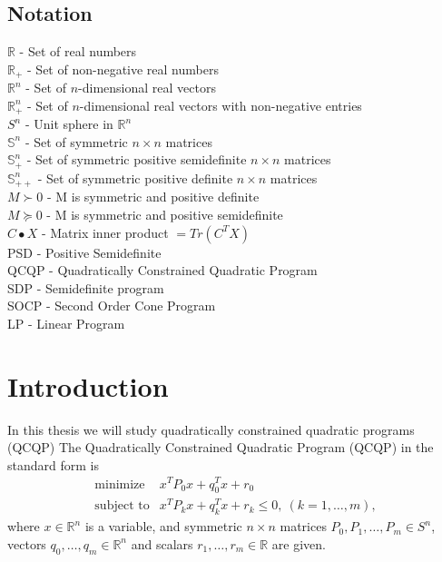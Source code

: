 \documentclass[12pt]{book}
\author{Matúš Stehlík}
\theoremstyle{definition}
\begin{document}
\section*{Notation}

$\mathbb{R}$ - Set of real numbers \\
$\mathbb{R}_+$ - Set of non-negative real numbers \\
$\mathbb{R}^n$ - Set of $n$-dimensional real vectors   \\
$\mathbb{R}^n_{+}$ -  Set of $n$-dimensional real vectors with non-negative entries  \\

$S^n$ - Unit sphere in $\mathbb{R}^n$ \\


$\mathbb{S}^n$ - Set of symmetric $n\times n$ matrices \\
$\mathbb{S}^n_+$ - Set of symmetric positive semidefinite $n\times n$ matrices \\
$\mathbb{S}^n_{++}$ - Set of symmetric positive definite $n\times n$ matrices \\

$M\succ 0$ - M is symmetric and positive definite \\
$M\succeq 0$ - M is symmetric and positive semidefinite \\
$C\bullet X$ - Matrix inner product $=Tr(C^TX)$\\

PSD - Positive Semidefinite \\

QCQP - Quadratically Constrained Quadratic Program \\
SDP - Semidefinite program \\
SOCP - Second Order Cone Program \\
LP - Linear Program


\chapter{Introduction}

In this thesis we will study quadratically constrained quadratic programs (QCQP)
\label{defQCQP}
The Quadratically Constrained Quadratic Program (QCQP) in the standard form is
\begin{equation}
\label{qcqp} 
\begin{array}{ll}
\mbox{minimize}& x^TP_0x + q_0^Tx +r_0 \\
\mbox{subject to}& x^TP_kx + q_k^Tx + r_k \leq 0, \  (k = 1,\dots ,m),
\end{array} 
\end{equation}
where $x\in \mathbb{R}^n$ is a variable, and symmetric $n\times n$ matrices $P_0, P_1, \dots ,P_m \in S^n$, vectors $q_0,\dots ,q_m \in \mathbb{R}^n$ and scalars $r_1,\dots ,r_m\in \mathbb{R}$ are given.
\end{document}
